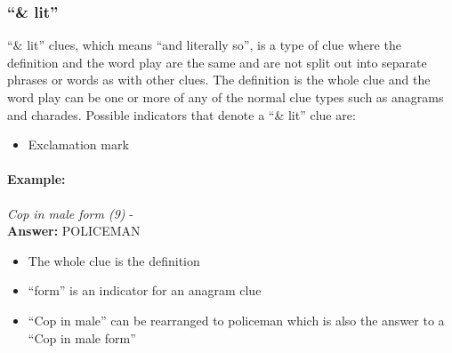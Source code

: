 \subsubsection{``\& lit''}

``\& lit'' clues, which means ``and literally so'', is a type of clue where the
definition and the word play are the same and are not split out into separate
phrases or words as with other clues. The definition is the whole clue and the
word play can be one or more of any of the normal clue types such as anagrams
and charades. Possible indicators that denote a ``\& lit'' clue are:

\begin{itemize} 
    \item Exclamation mark
\end{itemize}

\paragraph{Example:} \emph{Cop in male form (9)} - \citep{shuchiLit08} \\
\textbf{Answer:} POLICEMAN 

\begin{itemize}
    \item The whole clue is the definition 
    \item ``form'' is an indicator for an anagram clue 
    \item ``Cop in male'' can be rearranged to policeman which is also the 
    answer to a ``Cop in male form''
\end{itemize}